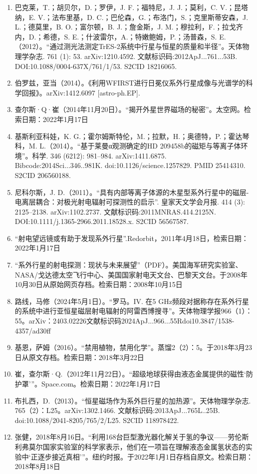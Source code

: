 \begin{enumerate}
\item 巴克莱，T.；胡贝尔，D.；罗伊，J. F.；福特尼，J. J.；莫利，C. V.；昆塔纳，E. V.；法布里基，D. C.；巴伦森，G.；布洛门，S.；克里斯蒂安森，J. L.；德莫里，B. O.；富尔顿，B. J.；詹金斯，J. M.；穆拉利，F.；拉戈齐内，D.；希德，S. E.；什波雷尔，A.；特嫩鲍姆，P.；汤普森，S. E.（2012）。“通过测光法测定TrES-2系统中行星与恒星的质量和半径”。天体物理学杂志. 761 (1): 53. arXiv:1210.4592. 文献标识码:2012ApJ...761...53B. DOI:10.1088/0004-637X/761/1/53. S2CID 18216065.
\item 伯罗兹，亚当（2014）。《利用WFIRST进行日冕仪系外行星成像与光谱学的科学回报》。arXiv:1412.6097 [astro-ph.EP].
\item 查尔斯·Q·崔（2014年11月20日）。“揭开外星世界磁场的秘密”。太空网。检索日期：2022年1月17日
\item 基斯利亚科娃，K. G.；霍尔姆斯特伦，M.；拉默，H.；奥德特，P.；霍达琴科，M. L.（2014）。“基于莱曼α观测确定的HD 209458b的磁矩与等离子体环境”。科学. 346 (6212): 981–984. arXiv:1411.6875. Bibcode:2014Sci...346..981K. doi:10.1126/science.1257829. PMID 25414310. S2CID 206560188.
\item 尼科尔斯，J. D.（2011）。“具有内部等离子体源的木星型系外行星中的磁层-电离层耦合：对极光射电辐射可探测性的启示”. 皇家天文学会月报. 414 (3): 2125–2138. arXiv:1102.2737. 文献标识码:2011MNRAS.414.2125N. DOI:10.1111/j.1365-2966.2011.18528.x. S2CID 56567587.
\item “射电望远镜或有助于发现系外行星”.Redorbit，2011年4月18日，检索日期：2022年1月17日
\item “系外行星的射电探测：现状与未来展望”（PDF）。美国海军研究实验室、NASA/戈达德太空飞行中心、美国国家射电天文台、巴黎天文台。于2008年10月30日从原始网页存档。检索日期：2008年10月15日
\item 路线，马修（2024年5月1日）。“罗马。IV. 在5 GHz频段对据称存在系外行星的系统中进行亚恒星磁层射电辐射的阿雷西博搜寻”。天体物理学报966（1）：55。arXiv：2403.02226文献标识码2024ApJ...966...55Rdoi10.3847/1538-4357/ad30ff
\item 基恩，萨姆（2016）。“禁用植物，禁用化学”。蒸馏2（2）：5。于2018年3月23日从原文存档。检索日期：2018年3月22日
\item 崔，查尔斯·Q.（2012年11月22日）。“超级地球获得由液态金属提供的磁性‘防护罩’”。Space.com。检索日期：2022年1月17日
\item 布扎西，D.（2013）。“恒星磁场作为系外巨行星的加热源”。天体物理学杂志. 765（2）：L25。arXiv:1302.1466. 文献标识码:2013ApJ...765L..25B. doi:10.1088/2041-8205/765/2/L25. S2CID 118978422.
\item 张健，2018年8月16日。“利用168台巨型激光器化解关于氢的争议——劳伦斯利弗莫尔国家实验室的科学家表示，他们在一项旨在理解液态金属氢状态的实验中‘正逐步接近真相’”。纽约时报。于2022年1月1日存档自原文。检索日期：2018年8月18日

\end{enumerate}
